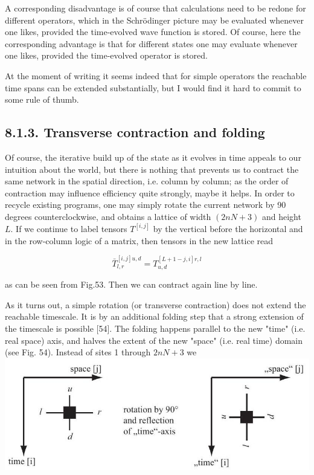 \documentclass[12pt]{article}
\begin{document}
A corresponding disadvantage is of course that calculations need to be redone for different operators, which in the Schrödinger picture may be evaluated whenever one likes, provided the time-evolved wave function is stored. Of course, here the corresponding advantage is that for different states one may evaluate whenever one likes, provided the time-evolved operator is stored.

At the moment of writing it seems indeed that for simple operators the reachable time spans can be extended substantially, but I would find it hard to commit to some rule of thumb.

\subsection*{8.1.3. Transverse contraction and folding}
Of course, the iterative build up of the state as it evolves in time appeals to our intuition about the world, but there is nothing that prevents us to contract the same network in the spatial direction, i.e. column by column; as the order of contraction may influence efficiency quite strongly, maybe it helps. In order to recycle existing programs, one may simply rotate the current network by 90 degrees counterclockwise, and obtains a lattice of width $(2 n N+3)$ and height $L$. If we continue to label tensors $T^{[i, j]}$ by the vertical before the horizontal and in the row-column logic of a matrix, then tensors in the new lattice read


\begin{equation*}
\bar{T}_{l, r}^{[i, j] u, d}=T_{u, d}^{[L+1-j, i] r, l} \tag{284}
\end{equation*}


as can be seen from Fig.53. Then we can contract again line by line.

As it turns out, a simple rotation (or transverse contraction) does not extend the reachable timescale. It is by an additional folding step that a strong extension of the timescale is possible [54]. The folding happens parallel to the new "time" (i.e. real space) axis, and halves the extent of the new "space" (i.e. real time) domain (see Fig. 54). Instead of sites 1 through $2 n N+3$ we\\
\includegraphics[max width=\textwidth, center]{2024_05_04_afc4ad226da9ccfe0ac8g-092(1)}
\end{document}
